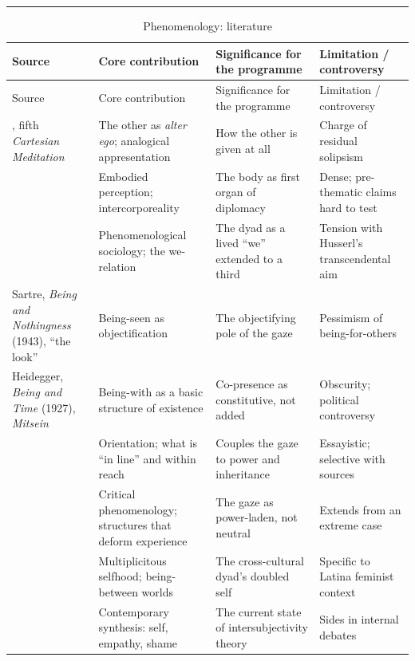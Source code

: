 \documentclass[11pt,a4paper]{article}
\newcommand{\goldrule}{\noindent\textcolor{gold}{\rule{\linewidth}{0.6pt}}\par\vspace{0.4em}}
\begin{document}
\goldrule
\footnotesize
\begin{longtable}{Y Y Y Y}
\caption{Phenomenology: literature}\label{p07:tab:lit-phenom-frame}\\
\toprule
{}
Source & Core contribution & Significance for the programme & Limitation / controversy \\
\midrule
\endfirsthead
{}
Source & Core contribution & Significance for the programme & Limitation / controversy \\
\midrule
\endhead
\textcite{husserl1931cm}, fifth \emph{Cartesian Meditation} & The other as \emph{alter ego}; analogical appresentation & How the other is given at all & Charge of residual solipsism \\
\textcite{merleauponty1945} & Embodied perception; intercorporeality & The body as first organ of diplomacy & Dense; pre-thematic claims hard to test \\
\textcite{schutz1932} & Phenomenological sociology; the we-relation & The dyad as a lived ``we'' extended to a third & Tension with Husserl's transcendental aim \\
Sartre, \emph{Being and Nothingness} (1943), ``the look'' & Being-seen as objectification & The objectifying pole of the gaze & Pessimism of being-for-others \\
Heidegger, \emph{Being and Time} (1927), \emph{Mitsein} & Being-with as a basic structure of existence & Co-presence as constitutive, not added & Obscurity; political controversy \\
\textcite{ahmed2006queer} & Orientation; what is ``in line'' and within reach & Couples the gaze to power and inheritance & Essayistic; selective with sources \\
\textcite{guenther2013} & Critical phenomenology; structures that deform experience & The gaze as power-laden, not neutral & Extends from an extreme case \\
\textcite{ortega2016} & Multiplicitous selfhood; being-between worlds & The cross-cultural dyad's doubled self & Specific to Latina feminist context \\
\textcite{zahavi2014self} & Contemporary synthesis: self, empathy, shame & The current state of intersubjectivity theory & Sides in internal debates \\
\bottomrule
\end{longtable}
\end{document}
